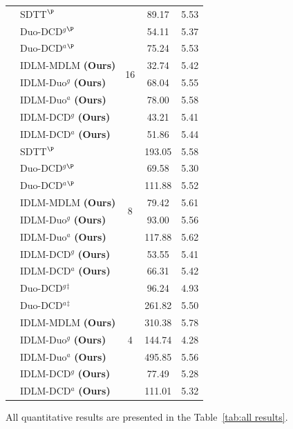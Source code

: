 \begin{table}[t!]
{\begin{tabular}{llccc}
        \midrule
            &   SDTT$^\P$~{\scriptsize \citep{deschenaux2024beyond}} &  \multirow{8}{*}{16} &  89.17 &  5.53 \\
            & Duo-DCD$^g$$^\P$~{\scriptsize \citep{sahoo2025the}}  &  &  54.11 & 5.37 \\ 
            & Duo-DCD$^a$$^\P$~{\scriptsize \citep{sahoo2025the}}  &  &  75.24 & 5.53 \\
            &IDLM-MDLM \textbf{(Ours)}  &  &  32.74 &  5.42 \\ 
            &IDLM-Duo$^g$ \textbf{(Ours)}  &  &  68.04 &  5.55 \\
            &IDLM-Duo$^a$ \textbf{(Ours)}  &  &  78.00 &  5.58 \\
            &IDLM-DCD$^g$ \textbf{(Ours)}  &  &  43.21 &  5.41 \\
            &IDLM-DCD$^a$ \textbf{(Ours)}  &  &  51.86 &  5.44 \\
        \midrule
            &   SDTT$^\P$~{\scriptsize \citep{deschenaux2024beyond}} &  \multirow{8}{*}{8} &  193.05 &  5.58 \\
            & Duo-DCD$^g$$^\P$~{\scriptsize \citep{sahoo2025the}}  & &  69.58 & 5.30 \\ 
            & Duo-DCD$^a$$^\P$~{\scriptsize \citep{sahoo2025the}}  & &  111.88 & 5.52 \\ 
            &IDLM-MDLM \textbf{(Ours)}  &  &  79.42 &  5.61 \\ 
            &IDLM-Duo$^g$ \textbf{(Ours)}  &  &  93.00 &  5.56 \\
            &IDLM-Duo$^a$ \textbf{(Ours)}  &  &  117.88 &  5.62 \\
            &IDLM-DCD$^g$ \textbf{(Ours)}  &  &  53.55 &  5.41 \\
            &IDLM-DCD$^a$ \textbf{(Ours)}  &  &  66.31 &  5.42 \\
        \midrule
            & Duo-DCD$^g$$^\ddag$~{\scriptsize \citep{sahoo2025the}}  & \multirow{7}{*}{4} &  96.24 & 4.93 \\
            & Duo-DCD$^a$$^\ddag$~{\scriptsize \citep{sahoo2025the}}  & & 261.82  & 5.50  \\
            & IDLM-MDLM \textbf{(Ours)}  &  &  310.38 &  5.78 \\ 
            & IDLM-Duo$^g$ \textbf{(Ours)}  &  &  144.74 &  4.28 \\ 
            & IDLM-Duo$^a$ \textbf{(Ours)}  &  & 495.85 & 5.56 \\ 
            &IDLM-DCD$^g$ \textbf{(Ours)}  &  &  77.49 &  5.28 \\
            &IDLM-DCD$^a$ \textbf{(Ours)}  &  &  111.01 &  5.32 \\
        \bottomrule
      \end{tabular}}
    \end{table}
    
    All quantitative results are presented in the Table~\ref{tab:all results}.